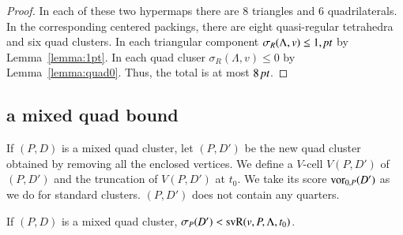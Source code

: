 \begin{proof}
In each of these two hypermaps there are $8$ triangles and
$6$ quadrilaterals.  In the corresponding centered packings,
there are  eight quasi-regular tetrahedra and six quad clusters.
In each triangular component $\sigma_R(\Lambda,v)\le 1,\hbox{\it pt}$ by Lemma~\ref{lemma:1pt}.
In each quad cluser $\sigma_R(\Lambda,v)\le 0$ by Lemma~\ref{lemma:quad0}.  
Thus, the total is
at most $8\,\hbox{\it pt}$.
\end{proof}











\subsection{a mixed quad bound}%



\smallskip
If $(P,D)$ is a mixed quad cluster, let $(P,D')$ be the new quad
cluster obtained by removing all the enclosed vertices.  We define
a $V$-cell $V(P,D')$ of $(P,D')$ and the truncation of $V(P,D')$
at $t_0$. We take its score ${\operatorname{vor}}_{0,P}(D')$  as we do for
standard clusters.  $(P,D')$ does not contain any quarters.

\begin{lemma} \label{lemma:mixed-vor0}
If $(P,D)$ is a mixed quad cluster, $\sigma_P(D') <
{\operatorname{svR}}(v,P,\Lambda,t_0)$.  
\end{lemma}

